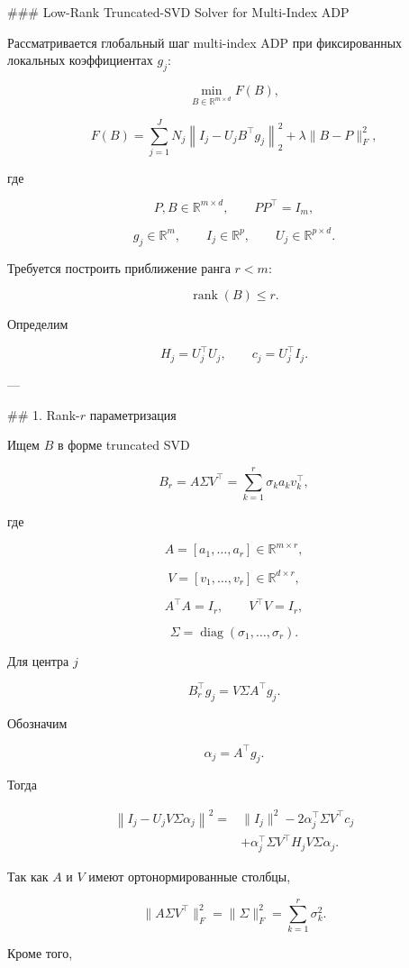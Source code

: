 ### Low-Rank Truncated-SVD Solver for Multi-Index ADP

Рассматривается глобальный шаг multi-index ADP при фиксированных локальных коэффициентах \(g_j\):

\[
\min_{B\in\mathbb R^{m\times d}}
F(B),
\]

\[
F(B)
=
\sum_{j=1}^{J}
N_j
\left\|
I_j-U_jB^\top g_j
\right\|_2^2
+
\lambda\|B-P\|_F^2,
\]

где

\[
P,B\in\mathbb R^{m\times d},\qquad
PP^\top=I_m,
\]

\[
g_j\in\mathbb R^m,\qquad
I_j\in\mathbb R^p,\qquad
U_j\in\mathbb R^{p\times d}.
\]

Требуется построить приближение ранга \(r<m\):

\[
\operatorname{rank}(B)\le r.
\]

Определим

\[
H_j=U_j^\top U_j,
\qquad
c_j=U_j^\top I_j.
\]

---

## 1. Rank-\(r\) параметризация

Ищем \(B\) в форме truncated SVD

\[
B_r=A\Sigma V^\top
=
\sum_{k=1}^{r}\sigma_k a_kv_k^\top,
\]

где

\[
A=[a_1,\ldots,a_r]\in\mathbb R^{m\times r},
\]

\[
V=[v_1,\ldots,v_r]\in\mathbb R^{d\times r},
\]

\[
A^\top A=I_r,
\qquad
V^\top V=I_r,
\]

\[
\Sigma=\operatorname{diag}(\sigma_1,\ldots,\sigma_r).
\]

Для центра \(j\)

\[
B_r^\top g_j
=
V\Sigma A^\top g_j.
\]

Обозначим

\[
\alpha_j=A^\top g_j.
\]

Тогда

\[
\begin{aligned}
\left\|
I_j-U_jV\Sigma\alpha_j
\right\|^2
={}&
\|I_j\|^2
-
2\alpha_j^\top\Sigma V^\top c_j
\\
&+
\alpha_j^\top
\Sigma V^\top H_jV\Sigma\alpha_j.
\end{aligned}
\]

Так как \(A\) и \(V\) имеют ортонормированные столбцы,

\[
\|A\Sigma V^\top\|_F^2
=
\|\Sigma\|_F^2
=
\sum_{k=1}^r\sigma_k^2.
\]

Кроме того,

